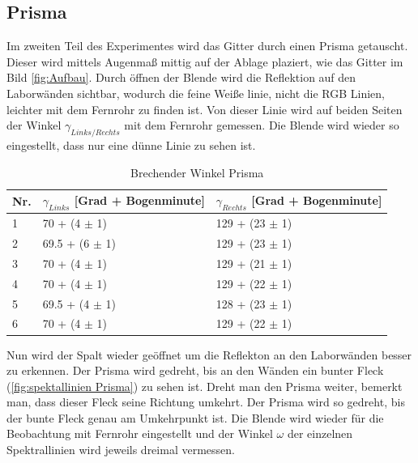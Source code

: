 \documentclass[12pt,a4paper,twoside]{article}
\begin{document}
\subsection{Prisma}
Im zweiten Teil des Experimentes wird das Gitter durch einen Prisma getauscht. 
Dieser wird mittels Augenmaß mittig auf der Ablage plaziert, wie das Gitter im Bild \ref{fig:Aufbau}. 
Durch öffnen der Blende wird die Reflektion auf den Laborwänden sichtbar, wodurch die feine Weiße linie, nicht die RGB Linien, leichter mit dem Fernrohr zu finden ist. 
Von dieser Linie wird auf beiden Seiten der Winkel $\gamma_{Links/Rechts}$ mit dem Fernrohr gemessen. Die Blende wird wieder so eingestellt, dass nur eine dünne Linie zu sehen ist. 

\begin{table}[H]
    \centering
    \caption{Brechender Winkel Prisma}
    \label{tab:Prisma}
    \begin{tabular}{| l | l | l |}
        \hline
        Nr.  & $\gamma_{Links}$ [Grad + Bogenminute] & $\gamma_{Rechts}$ [Grad + Bogenminute] \\
        \hline
        1 & 70 +    (4 $\pm$ 1) & 129 + (23 $\pm$ 1) \\
        2 & 69.5 +  (6 $\pm$ 1) & 129 + (23 $\pm$ 1) \\
        3 & 70 +    (4 $\pm$ 1) & 129 + (21 $\pm$ 1) \\
        4 & 70 +    (4 $\pm$ 1) & 129 + (22 $\pm$ 1) \\
        5 & 69.5 +  (4 $\pm$ 1) & 128 + (23 $\pm$ 1) \\
        6 & 70 +    (4 $\pm$ 1) & 129 + (22 $\pm$ 1) \\
        \hline
    \end{tabular}
\end{table}

\noindent
Nun wird der Spalt wieder geöffnet um die Reflekton an den Laborwänden besser zu erkennen. Der Prisma wird gedreht, bis an den Wänden ein bunter Fleck (\ref{fig:spektallinien Prisma}) zu sehen ist. 
Dreht man den Prisma weiter, bemerkt man, dass dieser Fleck seine Richtung umkehrt. Der Prisma wird so gedreht, bis der bunte Fleck genau am Umkehrpunkt ist. 
Die Blende wird wieder für die Beobachtung mit Fernrohr eingestellt und der Winkel $\omega$ der einzelnen Spektrallinien wird jeweils dreimal vermessen. 
\end{document}
